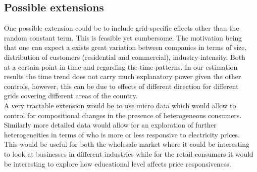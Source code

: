 \subsection{Possible extensions}
\label{subsec:r_extensions}
One possible extension could be to include grid-specific effects other than the random constant term. This is feasible yet cumbersome. The motivation being that one can expect a exists great variation between companies in terms of size, distribution of customers (residential and commercial), industry-intensity. Both at a certain point in time and regarding the time patterns. In our estimation results the time trend does not carry much explanatory power given the other controls, however, this can be due to effects of different direction for different grids covering different areas of the country.
\bigskip\\
A very tractable extension would be to use micro data which would allow to control for compositional changes in the presence of heterogeneous consumers. Similarly more detailed data would allow for an exploration of further heterogeneities in terms of who is more or less responsive to electricity prices. This would be useful for both the wholesale market where it could be interesting to look at businesses in different industries while for the retail consumers it would be interesting to explore how educational level affects price responsiveness.
